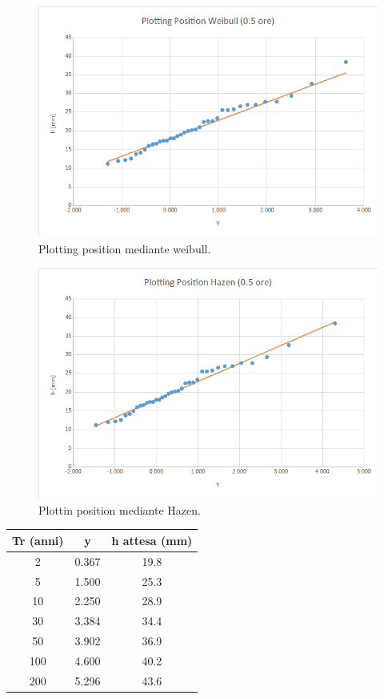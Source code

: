     \begin{figure}[H]\centering
        \includegraphics[scale=.5]{immagini/plot_pos_weib_05ore.png}
        \caption{Plotting position mediante weibull.}
      \label{plot_pos_weib_05ore}
    \end{figure}

    \begin{figure}[H]\centering
        \includegraphics[scale=.5]{immagini/plot_pos_hazen_05ore.png}
        \caption{Plottin position mediante Hazen.}
      \label{plot_pos_hazen_05ore}
    \end{figure}

\begin{table}[H] \centering
        \begin{tabular}{ccc}
        \toprule
        Tr (anni) & y     & h attesa (mm) \\
        \midrule
        2 & 0.367 & 19.8  \\
        5 & 1.500 & 25.3  \\
        10  & 2.250 & 28.9          \\
        30  & 3.384 & 34.4          \\
        50  & 3.902 & 36.9          \\
        100 & 4.600 & 40.2          \\
        200 & 5.296 & 43.6          \\         
        \bottomrule
        \end{tabular}
\end{table}
    
